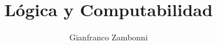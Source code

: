 

\title{Lógica y Computabilidad}
\author{Gianfranco Zambonni}



\newtheorem{definicion}{Definición}[section]
\newtheorem{teorema}{Teorema}[section]
\newtheorem{corolario}{Corolario}[section]
\newtheorem{proposicion}{Proposición}[section]


	
	\maketitle
	\tableofcontents
	\newpage
		
	
	\newpage
	
	
	\appendix
	\newpage
	




